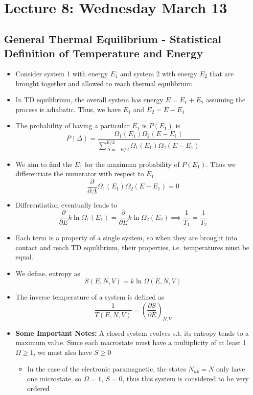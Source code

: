 \documentclass[8pt]{article}
\begin{document}
\section{Lecture 8: Wednesday March 13}
\subsection{General Thermal Equilibrium - Statistical Definition of Temperature and Energy}
\begin{itemize}
    \item Consider system 1 with energy $E_1$ and system 2 with energy $E_2$ that are brought together and allowed to reach thermal equilibrium. 
    \item In TD equilibrium, the overall system has energy $E = E_1 + E_2$ assuming the process is adiabatic. Thus, we have $E_1$ and $E_2 = E - E_1$ 
    \item The probability of having a particular $E_1$ is $P(E_1)$ is \[P(\Delta) = \frac{\Omega_1(E_1) \Omega_2(E - E_1)}{{\sum^{E/2}_{\bar{\Delta} = -E/2}} \Omega_1(E_1) \Omega_2(E - E_1)} \]
    \item   We aim to find the $E_1$ for the maximum probability of $P(E_1)$. Thus we differentiate the numerator with respect to $E_1$ \[\frac{\partial }{\partial \Delta} \Omega_1(E_1) \Omega_2(E-E_1) = 0\]
    \item Differentiation eventually leads to \[\frac{\partial }{\partial E} k\ln \Omega_1 (E_1) = \frac{\partial }{\partial E} k\ln \Omega_2 (E_2) \implies \frac{1}{T_1} = \frac{1}{T_2}\] 
    \item Each term is a property of a single system, so when they are brought into contact and reach TD equilibrium, their properties, i.e. temperatures must be equal.
    \item We define, entropy as \[S(E, N,V)   = k \ln \Omega (E,N,V)\] 
    \item The inverse temperature of a system is defined as \[\frac{1}{T(E,N,V)} = (\frac{\partial S}{\partial E})_{N,V}\]
    \item \textbf{Some Important Notes:} A closed system evolves s.t. its entropy tends to a maximum value. Since each macrostate must have a multiplicity of at least 1 $\Omega \geq 1$, we must also have $S \geq 0$ 
    \begin{itemize}
        \item In the case of the electronic paramagnetic, the states $N_{up} = N$ only have one microstate, so $\Omega = 1$, $S =0$, thus this system is considered to be very ordered 

\end{itemize}
\end{itemize}
\end{document}
